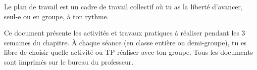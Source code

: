 \tetePremStssBiol

\vspace*{-8pt}

\begin{importants}
  Le plan de travail est un cadre de travail collectif où tu as la liberté d'avancer, seul-e ou en groupe, à ton rythme.
  
  Ce document présente les activités et travaux pratiques à réaliser pendant les 3 semaines du chapitre.
  À chaque séance (en classe entière ou demi-groupe), tu es libre de choisir quelle activité ou TP réaliser avec ton groupe.
  Tous les documents sont imprimés sur le bureau du professeur.
\end{importants}


\vspace*{-16pt}

